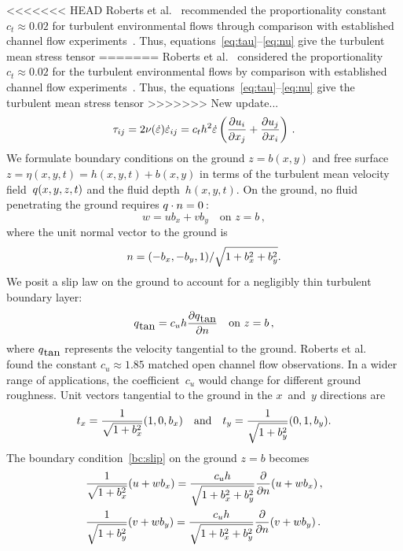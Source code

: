 \documentclass[twocolumn]{afmc_art}
\newcommand{\ros}{{\dot\varepsilon}}
\renewcommand{\vec}[1]{\text{\boldmath$#1$}}
\begin{document}
<<<<<<< HEAD
Roberts et al.~\cite{Roberts2008} recommended the proportionality constant $c_t\approx0.02$ for turbulent environmental flows through comparison with established channel flow experiments~\cite[e.g.]{Nezu2005}.
Thus, equations~\eqref{eq:tau}--\eqref{eq:nu} give the turbulent mean stress tensor
=======
Roberts et al.~\cite{Roberts2008} considered the proportionality $c_t\approx0.02$ for the turbulent environmental flows by comparison with established channel flow experiments~\cite[e.g.]{Nezu2005}.
Thus, the equations~\eqref{eq:tau}--\eqref{eq:nu} give the turbulent mean stress tensor
>>>>>>> New update...
\begin{equation}
\tau_{ij}=2\nu(\ros)\ros_{ij}=c_th^2\ros\left( \D{x_j}{u_i} +\D{x_i}{u_j}\right) \,.\label{eq:stress}
\end{equation}
We formulate boundary conditions on the ground $z=b(x,y)$ and free surface $z=\eta(x,y,t)=h(x,y,t)+b(x,y)$ in terms of the turbulent mean velocity field~$\vec q(x,y,z,t)$ and the fluid depth~$h(x,y,t)$. 
On the ground, no fluid penetrating the ground requires $\vec q\cdot\vec n=0$\,:
\begin{equation}
w=ub_x+vb_y \quad\text{on } z=b\,,
\label{eq:nopen}
\end{equation}
where the unit normal vector to the ground is
\begin{equation}
\vec n=(-b_x,-b_y,1)/\sqrt{1+b_x^2+b_y^2}.
\label{eq:vecn}
\end{equation} 
We posit a slip law on the ground to account for a negligibly thin turbulent boundary layer:
\begin{equation}
\vec q_{\text{tan}}=c_uh\frac{\partial\vec q_{\text{tan}}}{\partial n} \quad\text{on } z=b\,,
\label{bc:slip}
\end{equation} 
where $\vec q_{\text{tan}}$ represents the velocity tangential to the ground. 
Roberts et al.~\cite{Roberts2008} found the constant $c_u\approx1.85$ matched open channel flow observations. 
In a wider range of applications, the coefficient~$c_u$ would change for different ground roughness. 
Unit vectors tangential to the ground in the $x$~and~$y$ directions are
\begin{equation*}
\vec t_x=\frac{1}{\sqrt{1+b_x^2}}(1,0,b_x)
\quad\text{and}\quad
\vec t_y=\frac{1}{\sqrt{1+b_y^2}}(0,1,b_y).
\end{equation*}
The boundary condition~\eqref{bc:slip} on the ground \(z=b\) becomes
\begin{align}&
\frac{1}{\sqrt{1+b_x^2}}(u+wb_x)=\frac{c_uh}{\sqrt{1+b_x^2+b_y^2}}\D n{}(u+wb_x)\,,\label{slip:u}\\&
\frac{1}{\sqrt{1+b_y^2}}(v+wb_y)=\frac{c_uh}{\sqrt{1+b_x^2+b_y^2}}\D n{}(v+wb_y)\,.\label{slip:v}
\end{align}
\end{document}
